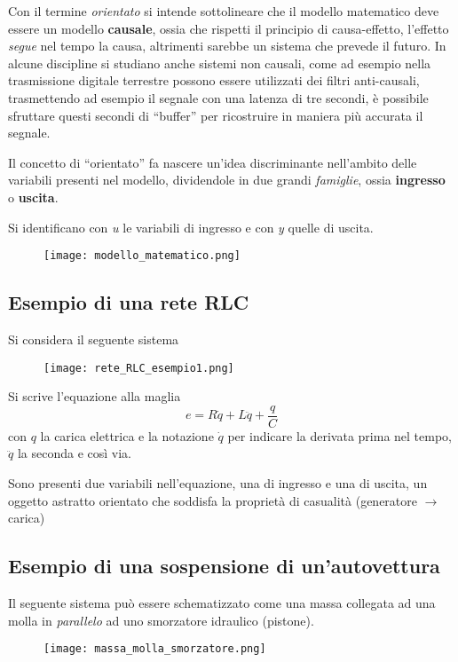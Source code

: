 Con il termine \textit{orientato} si intende sottolineare che il modello matematico deve essere un
modello \textbf{causale}, ossia che rispetti il principio di causa-effetto, l'effetto
\textit{segue} nel tempo la causa, altrimenti sarebbe un sistema che prevede il futuro. In alcune
discipline si studiano anche sistemi non causali, come ad esempio nella trasmissione digitale
terrestre possono essere utilizzati dei filtri anti-causali, trasmettendo ad esempio il segnale con
una latenza di tre secondi, è possibile sfruttare questi secondi di ``buffer'' per ricostruire in
maniera più accurata il segnale.

Il concetto di ``orientato'' fa nascere un'idea discriminante nell'ambito delle variabili presenti
nel modello, dividendole in due grandi \textit{famiglie}, ossia
\textbf{ingresso} o \textbf{uscita}.

Si identificano con \textit{u} le variabili di ingresso e con \textit{y} quelle di uscita.
\begin{figure}[h]
 \centering
 \texttt{[image: modello\_matematico.png]}
 \label{Fig.:modello_matematico}
\end{figure}

\subsection{Esempio di una rete RLC}
Si considera il seguente sistema
 \begin{figure}[h]
 \centering
 \texttt{[image: rete\_RLC\_esempio1.png]}
 \label{Fig.:circuito_RLC}
\end{figure}
Si scrive l'equazione alla maglia
\begin{equation}
 e = R \dot{q} + L\ddot{q} + \frac{q}{C}
\end{equation}
con $q$ la carica elettrica e la notazione $\dot{q}$ per indicare la derivata prima nel tempo,
$\ddot{q}$ la seconda e così via.

Sono presenti due variabili nell'equazione, una di ingresso e una di uscita, un oggetto astratto
orientato che soddisfa la proprietà di casualità (generatore $\rightarrow$ carica)

\newpage
\subsection{Esempio di una sospensione di un'autovettura}
Il seguente sistema può essere schematizzato come una massa collegata ad una molla in
\textit{parallelo} ad uno smorzatore idraulico (pistone).
\begin{figure}[h]
 \centering \texttt{[image: massa\_molla\_smorzatore.png]}
 \label{Fig.:massa_molla_smorzatore}
\end{figure}

